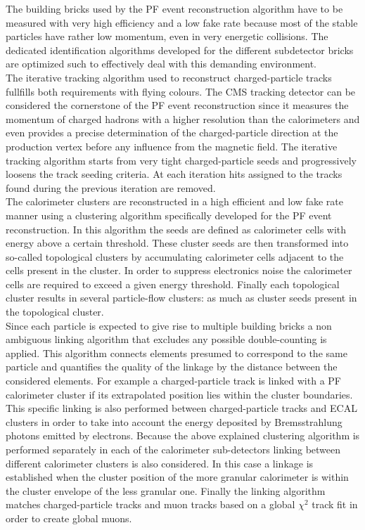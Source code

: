 The building bricks used by the PF event reconstruction algorithm have to be measured with very high efficiency and a low fake rate because most of the stable particles have rather low momentum, even in very energetic collisions.
The dedicated identification algorithms developed for the different subdetector bricks are optimized such to effectively deal with this demanding environment.
\\
The iterative tracking algorithm used to reconstruct charged-particle tracks fullfills both requirements with flying colours. The CMS tracking detector can be considered the cornerstone of the PF event reconstruction since it measures the momentum of charged hadrons with a higher resolution than the calorimeters and even provides a precise determination of the charged-particle direction at the production vertex before any influence from the magnetic field. The iterative tracking algorithm starts from very tight charged-particle seeds and progressively loosens the track seeding criteria. At each iteration hits assigned to the tracks found during the previous iteration are removed.%
\\
The calorimeter clusters are reconstructed in a high efficient and low fake rate manner using a clustering algorithm specifically developed for the PF event reconstruction. In this algorithm the seeds are defined as calorimeter cells with energy above a certain threshold. These cluster seeds are then transformed into so-called topological clusters by accumulating calorimeter cells adjacent to the cells present in the cluster. In order to suppress electronics noise the calorimeter cells are required to exceed a given energy threshold. Finally each topological cluster results in several particle-flow clusters: as much as cluster seeds present in the topological cluster.
\\

Since each particle is expected to give rise to multiple building bricks a non ambiguous linking algorithm that excludes any possible double-counting is applied. This algorithm connects elements presumed to correspond to the same particle and quantifies the quality of the linkage by the distance between the considered elements. For example a charged-particle track is linked with a PF calorimeter cluster if its extrapolated position lies within the cluster boundaries. This specific linking is also performed between charged-particle tracks and ECAL clusters in order to take into account the energy deposited by Bremsstrahlung photons emitted by electrons. Because the above explained clustering algorithm is performed separately in each of the calorimeter sub-detectors linking between different calorimeter clusters is also considered. In this case a linkage is established when the cluster position of the more granular calorimeter is within the cluster envelope of the less granular one. Finally the linking algorithm matches charged-particle tracks and muon tracks based on a global $\chi^{2}$ track fit in order to create global muons. %

